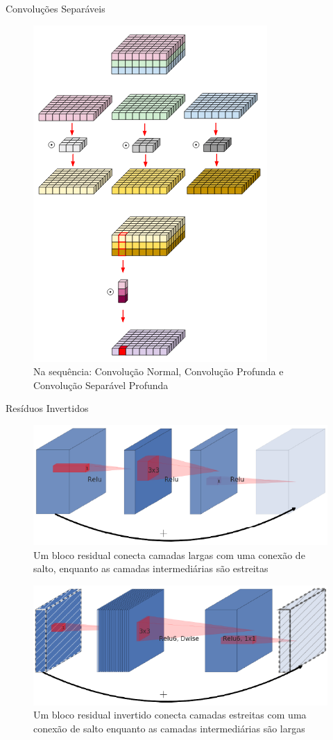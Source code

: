 \documentclass[10pt, compress]{beamer}
\begin{document}
\begin{frame}{Convoluções Separáveis}
\begin{figure}
\includegraphics[scale=0.25]{images/conv3.png}
\caption{Na sequência: Convolução Normal, Convolução Profunda e Convolução Separável Profunda}
\end{figure}
\end{frame}

\begin{frame}{Resíduos Invertidos}
\begin{figure}
\centering
\includegraphics[scale=0.25]{images/noinvert.png}
\caption{Um bloco residual conecta camadas largas com uma conexão de salto, enquanto as camadas intermediárias são estreitas}
\end{figure}

\begin{figure}
\includegraphics[scale=0.25]{images/invert.png}
\caption{Um bloco residual invertido conecta camadas estreitas com uma conexão de salto enquanto as camadas intermediárias são largas}
\end{figure}
\end{frame}
\end{document}
